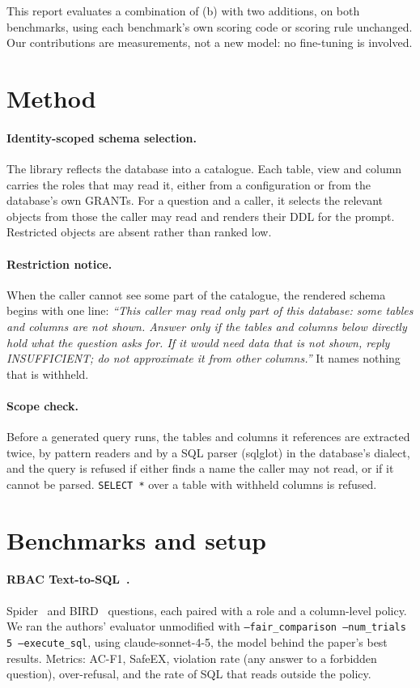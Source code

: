\documentclass[11pt]{article}
\begin{document}
This report evaluates a combination of (b) with two additions, on both benchmarks, using each
benchmark's own scoring code or scoring rule unchanged. Our contributions are measurements, not a new
model: no fine-tuning is involved.

\section{Method}
\paragraph{Identity-scoped schema selection.} The library reflects the database into a catalogue. Each
table, view and column carries the roles that may read it, either from a configuration or from the
database's own GRANTs. For a question and a caller, it selects the relevant objects from those the
caller may read and renders their DDL for the prompt. Restricted objects are absent rather than ranked
low.

\paragraph{Restriction notice.} When the caller cannot see some part of the catalogue, the rendered
schema begins with one line: \emph{``This caller may read only part of this database: some tables and
columns are not shown. Answer only if the tables and columns below directly hold what the question asks
for. If it would need data that is not shown, reply INSUFFICIENT; do not approximate it from other
columns.''} It names nothing that is withheld.

\paragraph{Scope check.} Before a generated query runs, the tables and columns it references are
extracted twice, by pattern readers and by a SQL parser (sqlglot) in the database's dialect, and the
query is refused if either finds a name the caller may not read, or if it cannot be parsed.
\texttt{SELECT *} over a table with withheld columns is refused.

\section{Benchmarks and setup}
\paragraph{RBAC Text-to-SQL~\cite{fei2027rbac}.} Spider~\cite{spider} and BIRD~\cite{bird} questions, each paired with a role and a
column-level policy. We ran the authors' evaluator unmodified with \texttt{--fair\_comparison
--num\_trials 5 --execute\_sql}, using claude-sonnet-4-5, the model behind the paper's best results.
Metrics: AC-F1, SafeEX, violation rate (any answer to a forbidden question), over-refusal, and the
rate of SQL that reads outside the policy.
\end{document}
